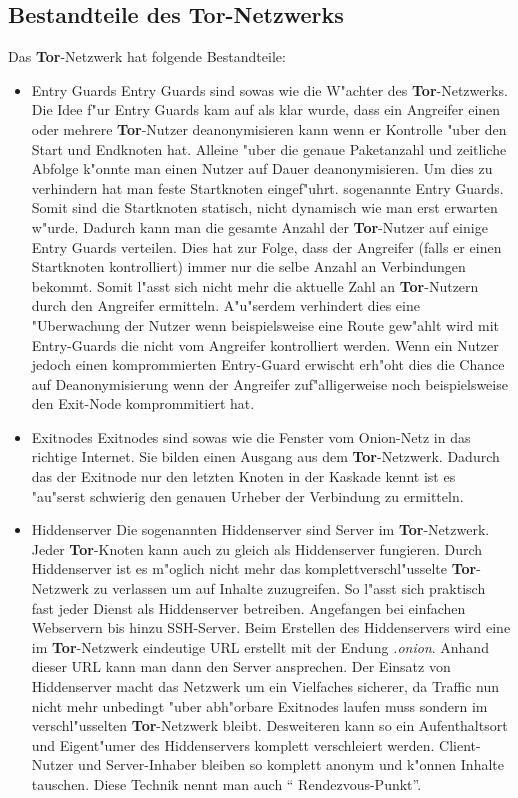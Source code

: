\documentclass[titlepage]{article}
\begin{document}
\subsection{Bestandteile des Tor-Netzwerks}
Das \textbf{Tor}-Netzwerk hat folgende Bestandteile:
\begin{itemize}
\item Entry Guards
\newline
Entry Guards sind sowas wie die W"achter des \textbf{Tor}-Netzwerks. Die Idee f"ur Entry Guards kam auf als klar wurde, dass ein Angreifer einen oder mehrere \textbf{Tor}-Nutzer deanonymisieren kann wenn er Kontrolle "uber den Start und Endknoten hat. Alleine "uber die genaue Paketanzahl und zeitliche Abfolge k"onnte man einen Nutzer auf Dauer deanonymisieren.
Um dies zu verhindern hat man feste Startknoten eingef"uhrt. sogenannte Entry Guards. Somit sind die Startknoten statisch, nicht dynamisch wie man erst erwarten w"urde. Dadurch kann man die gesamte Anzahl der \textbf{Tor}-Nutzer auf einige Entry Guards verteilen. Dies hat zur Folge, dass der Angreifer (falls er einen Startknoten kontrolliert) immer nur die selbe Anzahl an Verbindungen bekommt. Somit l"asst sich nicht mehr die aktuelle Zahl an \textbf{Tor}-Nutzern durch den Angreifer ermitteln. A"u"serdem verhindert dies eine "Uberwachung der Nutzer wenn beispielsweise eine Route gew"ahlt wird mit Entry-Guards die nicht vom Angreifer kontrolliert werden. Wenn ein Nutzer jedoch einen komprommierten Entry-Guard erwischt erh"oht dies die Chance auf Deanonymisierung wenn der Angreifer zuf"alligerweise noch beispielsweise den Exit-Node komprommitiert hat.
\item Exitnodes
\newline
Exitnodes sind sowas wie die Fenster vom Onion-Netz in das richtige Internet. Sie bilden einen Ausgang aus dem \textbf{Tor}-Netzwerk. Dadurch das der Exitnode nur den letzten Knoten in der Kaskade kennt ist es "au"serst schwierig den genauen Urheber der Verbindung zu 
ermitteln.
\item Hiddenserver
\newline
Die sogenannten Hiddenserver sind Server im \textbf{Tor}-Netzwerk. Jeder \textbf{Tor}-Knoten kann auch zu gleich als Hiddenserver fungieren. Durch Hiddenserver ist es m"oglich nicht mehr das komplettverschl"usselte \textbf{Tor}-Netzwerk zu verlassen um auf Inhalte zuzugreifen. So l"asst sich praktisch fast jeder Dienst als Hiddenserver betreiben. Angefangen bei einfachen Webservern bis hinzu SSH-Server. Beim Erstellen des Hiddenservers wird eine im \textbf{Tor}-Netzwerk eindeutige URL erstellt mit der Endung \textit{.onion}. Anhand dieser URL kann man dann den Server ansprechen. Der Einsatz von Hiddenserver macht das Netzwerk um ein Vielfaches sicherer, da Traffic nun nicht mehr unbedingt "uber abh"orbare Exitnodes laufen muss sondern im verschl"usselten \textbf{Tor}-Netzwerk bleibt. Desweiteren kann so ein Aufenthaltsort und Eigent"umer des Hiddenservers komplett verschleiert werden. Client-Nutzer und Server-Inhaber bleiben so komplett anonym und k"onnen Inhalte tauschen. Diese Technik nennt man auch `` Rendezvous-Punkt''.

\end{itemize}
\end{document}
